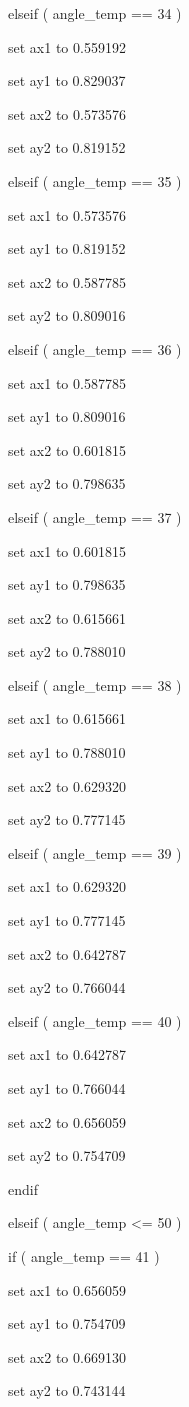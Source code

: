\documentclass[
]{article}
\begin{document}
elseif ( angle\_temp == 34 )

set ax1 to 0.559192

set ay1 to 0.829037

set ax2 to 0.573576

set ay2 to 0.819152

elseif ( angle\_temp == 35 )

set ax1 to 0.573576

set ay1 to 0.819152

set ax2 to 0.587785

set ay2 to 0.809016

elseif ( angle\_temp == 36 )

set ax1 to 0.587785

set ay1 to 0.809016

set ax2 to 0.601815

set ay2 to 0.798635

elseif ( angle\_temp == 37 )

set ax1 to 0.601815

set ay1 to 0.798635

set ax2 to 0.615661

set ay2 to 0.788010

elseif ( angle\_temp == 38 )

set ax1 to 0.615661

set ay1 to 0.788010

set ax2 to 0.629320

set ay2 to 0.777145

elseif ( angle\_temp == 39 )

set ax1 to 0.629320

set ay1 to 0.777145

set ax2 to 0.642787

set ay2 to 0.766044

elseif ( angle\_temp == 40 )

set ax1 to 0.642787

set ay1 to 0.766044

set ax2 to 0.656059

set ay2 to 0.754709

endif

elseif ( angle\_temp \textless= 50 )

if ( angle\_temp == 41 )

set ax1 to 0.656059

set ay1 to 0.754709

set ax2 to 0.669130

set ay2 to 0.743144
\end{document}
